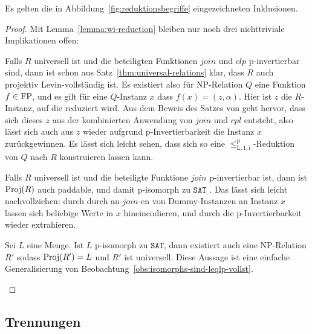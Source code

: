 \begin{lemma}
    Es gelten die in Abbildung~\ref{fig:reduktionsbegriffe} eingezeichneten Inklusionen.
\end{lemma}
\begin{proof}
    Mit Lemma~\ref{lemma:wi-reduction} bleiben nur noch drei nichttriviale Implikationen offen:
    \begin{prooflist}
        \item Falls $R$ universell ist und die beteiligten Funktionen $\mathit{join}$ und $\mathit{clp}$ p-invertierbar sind, dann ist schon aus Satz~\ref{thm:universal-relations} klar, dass $R$ auch projektiv Levin-vollständig ist.
            Es existiert also für NP-Relation $Q$ eine Funktion $f\in\mathrm{FP}$, und es gilt für eine $Q$-Instanz $x$ dass $f(x)=(z,\alpha)$. Hier ist $z$ die $R$-Instanz, auf die reduziert wird.
            Aus dem Beweis des Satzes von \textcite{agrawal_universal_1992} geht hervor, dass sich dieses $z$ aus der kombinierten Anwendung von $\mathit{join}$ und $\mathit{cpl}$ entsteht, also lässt sich auch aus $z$ wieder aufgrund p-Invertierbarkeit die Instanz $x$ zurückgewinnen.
            Es lässt sich leicht sehen, dass sich so eine $\leq_\mathrm{L,1,i}^\mathrm p$-Reduktion von $Q$ nach $R$ konstruieren lassen kann.
        \item  Falls $R$ universell ist und die beteiligte Funktione $\mathit{join}$ p-invertierbar ist, dann ist $\operatorname{Proj}(R)$ auch paddable, und damit p-isomorph zu $\mathtt{SAT}$ \parencite[Thm.~8.2]{agrawal_universal_1992}. Das lässt sich leicht nachvollziehen: durch  durch an-$\mathit{join}$-en von Dummy-Instanzen an Instanz $x$ lassen sich beliebige Werte in $x$ hineincodieren, und durch die p-Invertierbarkeit wieder extrahieren.
        \item Sei $L$ eine Menge. Ist $L$ p-isomorph zu $\mathtt{SAT}$, dann existiert auch eine NP-Relation $R'$ sodass $\operatorname{Proj}(R')=L$ und $R'$ ist universell. Diese Aussage ist eine einfache Generalisierung von Beobachtung~\ref{obs:isomorphs-sind-leqlp-vollst}.
    \end{prooflist}
\end{proof}

\subsection*{Trennungen}

